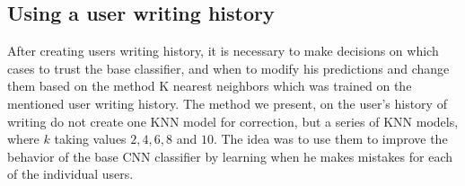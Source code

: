\documentclass{article}
\begin{document}
\subsection{Using a user writing history}

After creating users writing history, it is necessary to make decisions on which cases to trust the base classifier, and when to modify his predictions and change them based on the method K nearest neighbors
which was trained on the mentioned user writing history.
The method we present, on the user's history of writing do not create one KNN model for correction, but a series of KNN models, where $k$ taking values $2, 4, 6, 8$ and $10$.
The idea was to use them to improve the behavior of the base CNN classifier by learning when he makes mistakes for each of the individual users. 
\end{document}
